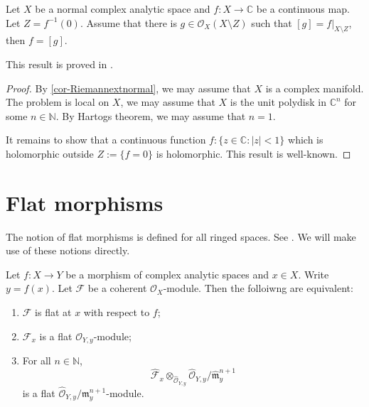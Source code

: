 \begin{proposition}\label{prop-Rado}
    Let $X$ be a normal complex analytic space and $f:X\rightarrow \mathbb{C}$ be a continuous map. Let $Z=f^{-1}(0)$. Assume that there is $g\in \mathcal{O}_X(X\setminus Z)$ such that $[g]=f|_{X\setminus Z}$, then $f=[g]$. 
\end{proposition}
This result is proved in \cite{Car52}.
\begin{proof}
    By \cref{cor-Riemannextnormal}, we may assume that $X$ is a complex manifold.
    The problem is local on $X$, we may assume that $X$ is the unit polydisk in $\mathbb{C}^n$ for some $n\in \mathbb{N}$. By Hartogs theorem, we may assume that $n=1$.

    It remains to show that a continuous function $f:\{z\in \mathbb{C}:|z|<1\}$ which  is holomorphic outside $Z:=\{f=0\}$ is holomorphic. This result is well-known.
 \end{proof}


 \section{Flat morphisms}
 The notion of flat morphisms is defined for all ringed spaces. See \cite[\href{https://stacks.math.columbia.edu/tag/02N2}{Tag 02N2}]{stacks-project}. We will make use of these notions directly.

 \begin{proposition}
    Let $f:X\rightarrow Y$ be a morphism of complex analytic spaces and $x\in X$. Write $y=f(x)$. Let $\mathcal{F}$ be a coherent $\mathcal{O}_X$-module. Then the folloiwng are equivalent:
    \begin{enumerate}
        \item $\mathcal{F}$ is flat at $x$ with respect to $f$;
        \item $\mathcal{F}_x$ is a flat $\mathcal{O}_{Y,y}$-module;
        \item For all $n\in \mathbb{N}$, 
            \[
                \hat{\mathcal{F}}_x\otimes_{\hat{\mathcal{O}}_{Y,y}}\hat{\mathcal{O}}_{Y,y}/\hat{\mathfrak{m}}_y^{n+1}  
            \]
            is a flat $\hat{\mathcal{O}}_{Y,y}/\mathfrak{m}_y^{n+1}$-module.
    \end{enumerate}
 \end{proposition}

 
\printbibliography



\iffalse

